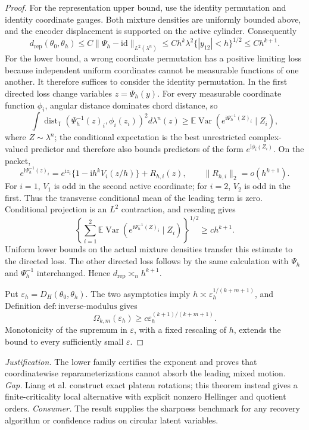 \documentclass{article}
\begin{document}
\begin{proof}
For the representation upper bound, use the identity permutation and identity coordinate gauges. Both mixture densities are uniformly bounded above, and the encoder displacement is supported on the active cylinder. Consequently
\[
d_{\mathrm{rep}}(\theta_0,\theta_h)
\le C\|\Psi_h-\mathrm{id}\|_{L^2(\lambda^n)}
\le C h^k\lambda^2\{|y_{12}|<h\}^{1/2}
\le C h^{k+1}.
\]
For the lower bound, a wrong coordinate permutation has a positive limiting loss because independent uniform coordinates cannot be measurable functions of one another. It therefore suffices to consider the identity permutation. In the first directed loss change variables \(z=\Psi_h(y)\). For every measurable coordinate function \(\phi_i\), angular distance dominates chord distance, so
\[
\int\operatorname{dist}_{\mathbb T}(\Psi_h^{-1}(z)_i,\phi_i(z_i))^2d\lambda^n(z)
\ge
\mathbb E\operatorname{Var}\!\left(e^{\mathrm i\Psi_h^{-1}(Z)_i}\mid Z_i\right),
\]
where \(Z\sim\lambda^n\); the conditional expectation is the best unrestricted complex-valued predictor and therefore also bounds predictors of the form \(e^{\mathrm i\phi_i(Z_i)}\). On the packet,
\[
e^{\mathrm i\Psi_h^{-1}(z)_i}
=e^{\mathrm iz_i}\{1-\mathrm i h^kV_i(z/h)\}+R_{h,i}(z),
\qquad
\|R_{h,i}\|_2=o(h^{k+1}).
\]
For \(i=1\), \(V_1\) is odd in the second active coordinate; for \(i=2\), \(V_2\) is odd in the first. Thus the transverse conditional mean of the leading term is zero. Conditional projection is an \(L^2\) contraction, and rescaling gives
\[
\left\{\sum_{i=1}^2
\mathbb E\operatorname{Var}(e^{\mathrm i\Psi_h^{-1}(Z)_i}\mid Z_i)\right\}^{1/2}
\ge c h^{k+1}.
\]
Uniform lower bounds on the actual mixture densities transfer this estimate to the directed loss. The other directed loss follows by the same calculation with \(\Psi_h\) and \(\Psi_h^{-1}\) interchanged. Hence \(d_{\mathrm{rep}}\asymp_n h^{k+1}\).

Put \(\varepsilon_h=D_H(\theta_0,\theta_h)\). The two asymptotics imply \(h\asymp\varepsilon_h^{1/(k+m+1)}\), and Definition \(\mathrm{def:inverse\text{-}modulus}\) gives
\[
\Omega_{k,m}(\varepsilon_h)
\ge c\varepsilon_h^{(k+1)/(k+m+1)}.
\]
Monotonicity of the supremum in \(\varepsilon\), with a fixed rescaling of \(h\), extends the bound to every sufficiently small \(\varepsilon\).
\end{proof}
\par\smallskip\noindent \textit{Justification.} The lower family certifies the exponent and proves that coordinatewise reparameterizations cannot absorb the leading mixed motion. \textit{Gap.} Liang et al. construct exact plateau rotations; this theorem instead gives a finite-criticality local alternative with explicit nonzero Hellinger and quotient orders. \textit{Consumer.} The result supplies the sharpness benchmark for any recovery algorithm or confidence radius on circular latent variables.
\end{document}
